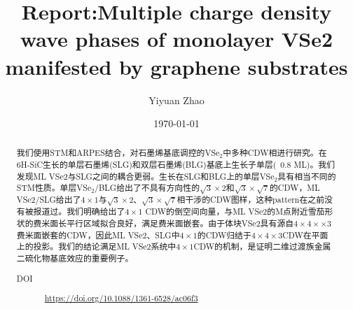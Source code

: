 \documentclass[reprint, aps, prb, showkeys]{revtex4-2}
\begin{document}
\title{Report:Multiple charge density wave phases of monolayer VSe2 \\
manifested by graphene substrates}

\author{Yiyuan Zhao}
\date{\today}

\begin{abstract}
我们使用STM和ARPES结合，对石墨烯基底调控的VSe$_2$中多种CDW相进行研究。在6H-SiC生长的单层石墨烯(SLG)和双层石墨烯(BLG)基底上生长子单层(~0.8 ML)。我们发现ML VSe2与SLG之间的耦合更弱。生长在SLG和BLG上的单层VSe$_2$具有相当不同的STM性质。单层VSe$_2$/BLG给出了不具有方向性的$\sqrt{3} \times 2$和$\sqrt{3} \times \sqrt{7}$的CDW，ML VSe2/SLG给出了$4 \times 1$与$\sqrt{3} \times 2$、$\sqrt{3} \times \sqrt{7}$相干涉的CDW图样，这种pattern在之前没有被报道过。我们明确给出了$4 \times 1$ CDW的倒空间向量，与ML VSe2的M点附近雪茄形状的费米面长平行区域拟合良好，满足费米面嵌套。由于体块VSe2具有源自$4 \times 4 \times \times 3$费米面嵌套的CDW，因此ML VSe2、SLG中$4 \times 1$的CDW归结于$4 \times 4\times 3$CDW在平面上的投影。我们的结论满足ML VSe2系统中$4 \times 1$CDW的机制，是证明二维过渡族金属二硫化物基底效应的重要例子。

\begin{description}
    \item[DOI] \url{https://doi.org/10.1088/1361-6528/ac06f3}
\end{description}
\end{abstract}


\maketitle
\end{document}
